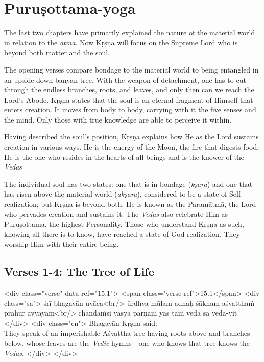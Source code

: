 \chapter{Puruṣottama-yoga}\label{chap-purusottama-yoga}

\noindent The last two chapters have primarily explained the nature of the material world in relation to the \textit{ātmā}. Now Kṛṣṇa will focus on the Supreme Lord who is beyond both matter and the soul.

The opening verses compare bondage to the material world to being entangled in an upside-down banyan tree. With the weapon of detachment, one has to cut through the endless branches, roots, and leaves, and only then can we reach the Lord’s Abode. Kṛṣṇa states that the soul is an eternal fragment of Himself that enters creation. It moves from body to body, carrying with it the five senses and the mind. Only those with true knowledge are able to perceive it within.

Having described the soul’s position, Kṛṣṇa explains how He as the Lord sustains creation in various ways. He is the energy of the Moon, the fire that digests food. He is the one who resides in the hearts of all beings and is the knower of the \textit{Vedas}

The individual soul has two states: one that is in bondage (\textit{kṣara}) and one that has risen above the material world (\textit{akṣara}), considered to be a state of Self-realization; but Kṛṣṇa is beyond both. He is known as the Paramātmā, the Lord who pervades creation and sustains it. The \textit{Vedas} also celebrate Him as Puruṣottama, the highest Personality. Those who understand Kṛṣṇa as such, knowing all there is to know, have reached a state of God-realization. They worship Him with their entire being.

\section{Verses 1-4: The Tree of Life}\label{sec-verses-1-4-the-tree-of-life}


\begin{html}
<div class="verse" data-ref="15.1">
  <span class="verse-ref">15.1</span>
  <div class="sa">
    śrī-bhagavān uvāca<br/>
    ūrdhva-mūlam adhaḥ-śākham aśvatthaṁ prāhur avyayam<br/>
    chandāṁsi yasya parṇāni yas taṁ veda sa veda-vit
  </div>
  <div class="en">
    \hspace*{1em}Bhagavān Kṛṣṇa said: \\ They speak of an imperishable Aśvattha tree having roots above and branches below, whose leaves are the \textit{Vedic} hymns---one who knows that tree knows the \textit{Vedas}.
  </div>
</div>
\end{html}



